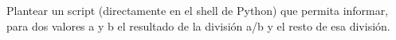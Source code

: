 Plantear un script (directamente en el shell de Python) que permita informar, para dos valores a y b el resultado de la división a/b y el resto de esa división.
